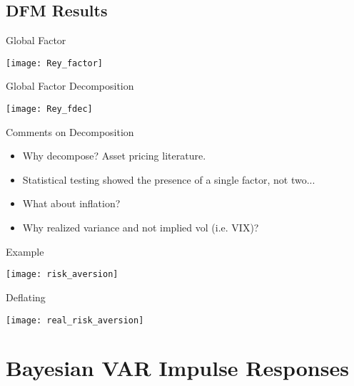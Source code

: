 \documentclass{beamer}
\begin{document}

\subsection{DFM Results}
\begin{frame}{Global Factor}
\begin{center}
 \texttt{[image: Rey\_factor]}
\end{center}
\end{frame}

\begin{frame}{Global Factor Decomposition}
\begin{center}
 \texttt{[image: Rey\_fdec]}
\end{center}
\end{frame} 

\begin{frame}{Comments on Decomposition}
\begin{itemize}
\item Why decompose? Asset pricing literature.
\item Statistical testing showed the presence of a single factor, not two...
\item What about inflation?
\item Why realized variance and not implied vol (i.e. VIX)?
\end{itemize}
\end{frame}

\begin{frame}{Example}
\begin{center}
\texttt{[image: risk\_aversion]}
\end{center}
\end{frame}

\begin{frame}{Deflating}
\begin{center}
\texttt{[image: real\_risk\_aversion]}
\end{center}
\end{frame}

\section{Bayesian VAR Impulse Responses}
\end{document}
